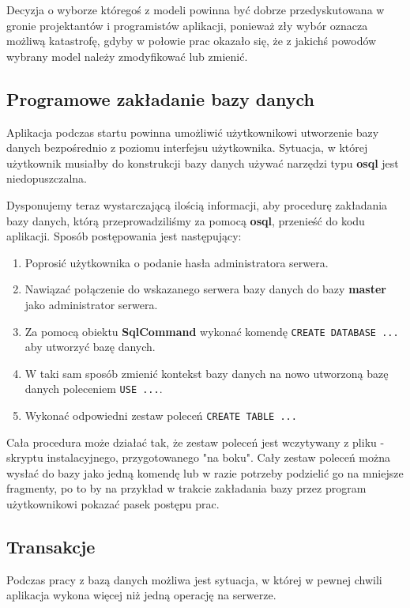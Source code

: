 Decyzja o wyborze któregoś z modeli powinna być dobrze przedyskutowana w gronie projektantów i programistów
aplikacji, ponieważ zły wybór oznacza możliwą katastrofę, gdyby w połowie prac okazało się, że
z jakichś powodów wybrany model należy zmodyfikować lub zmienić.

\subsection{Programowe zakładanie bazy danych}

Aplikacja podczas startu powinna umożliwić użytkownikowi utworzenie bazy danych bezpośrednio
z poziomu interfejsu użytkownika. Sytuacja, w której użytkownik musiałby do konstrukcji bazy danych
używać narzędzi typu {\bf osql} jest niedopuszczalna.

Dysponujemy teraz wystarczającą ilością informacji, aby procedurę zakładania bazy
danych, którą przeprowadziliśmy za pomocą {\bf osql}, przenieść do kodu aplikacji. 
Sposób postępowania jest następujący:
\begin{enumerate}
\item Poprosić użytkownika o podanie hasła administratora serwera.
\item Nawiązać połączenie do wskazanego serwera bazy danych do bazy {\bf master} jako administrator serwera.
\item Za pomocą obiektu {\bf SqlCommand} wykonać komendę {\tt CREATE DATABASE ...} aby utworzyć bazę danych.
\item W taki sam sposób zmienić kontekst bazy danych na nowo utworzoną bazę danych poleceniem {\tt USE ...}.
\item Wykonać odpowiedni zestaw poleceń {\tt CREATE TABLE ...}
\end{enumerate}

Cała procedura może działać tak, że zestaw poleceń jest wczytywany z pliku - skryptu instalacyjnego,
przygotowanego "na boku". Cały zestaw poleceń można wysłać do bazy jako jedną komendę lub w razie
potrzeby podzielić go na mniejsze fragmenty, po to by na przykład w trakcie zakładania bazy
przez program użytkownikowi pokazać pasek postępu prac.

\subsection{Transakcje}

Podczas pracy z bazą danych możliwa jest sytuacja, w której w pewnej chwili aplikacja wykona
więcej niż jedną operację na serwerze. 

